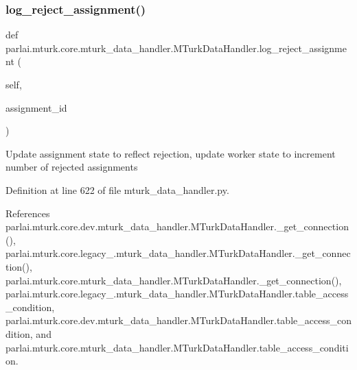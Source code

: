 \subsubsection{\texorpdfstring{log\+\_\+reject\+\_\+assignment()}{log\_reject\_assignment()}}
{\footnotesize\ttfamily def parlai.\+mturk.\+core.\+mturk\+\_\+data\+\_\+handler.\+M\+Turk\+Data\+Handler.\+log\+\_\+reject\+\_\+assignment (\begin{DoxyParamCaption}\item[{}]{self,  }\item[{}]{assignment\+\_\+id }\end{DoxyParamCaption})}

\begin{DoxyVerb}Update assignment state to reflect rejection, update worker state to
increment number of rejected assignments
\end{DoxyVerb}
 

Definition at line 622 of file mturk\+\_\+data\+\_\+handler.\+py.



References parlai.\+mturk.\+core.\+dev.\+mturk\+\_\+data\+\_\+handler.\+M\+Turk\+Data\+Handler.\+\_\+get\+\_\+connection(), parlai.\+mturk.\+core.\+legacy\+\_.\+mturk\+\_\+data\+\_\+handler.\+M\+Turk\+Data\+Handler.\+\_\+get\+\_\+connection(), parlai.\+mturk.\+core.\+mturk\+\_\+data\+\_\+handler.\+M\+Turk\+Data\+Handler.\+\_\+get\+\_\+connection(), parlai.\+mturk.\+core.\+legacy\+\_.\+mturk\+\_\+data\+\_\+handler.\+M\+Turk\+Data\+Handler.\+table\+\_\+access\+\_\+condition, parlai.\+mturk.\+core.\+dev.\+mturk\+\_\+data\+\_\+handler.\+M\+Turk\+Data\+Handler.\+table\+\_\+access\+\_\+condition, and parlai.\+mturk.\+core.\+mturk\+\_\+data\+\_\+handler.\+M\+Turk\+Data\+Handler.\+table\+\_\+access\+\_\+condition.

